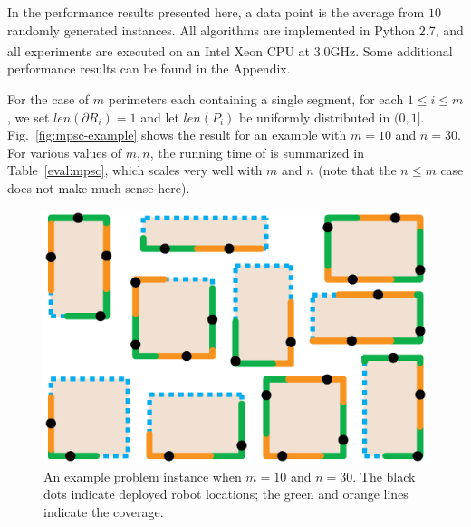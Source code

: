 In the performance results presented here, a data point is the 
average from $10$ randomly generated \opg instances. All algorithms 
are implemented in Python 2.7, and all experiments are executed on 
an Intel\textsuperscript{\textregistered} Xeon\textsuperscript{\textregistered} 
CPU at 3.0GHz. %
Some additional performance results can be found in the Appendix.

For the case of $m$ perimeters each containing a single segment, for 
each $1 \le i \le m$, we set $len(\partial R_i) = 1$ and let $len(P_i)$ 
be uniformly distributed in $(0, 1]$. Fig.~\ref{fig:mpsc-example} shows 
the result for an example with $m = 10$ and $n = 30$. For various values 
of $m, n$, the running time of \algoMRSimple is summarized in 
Table~\ref{eval:mpsc}, which scales very well with $m$ and $n$ (note that 
the $n \le m$ case does not make much sense here). 

\begin{figure}[ht!]
    \vspace*{-3mm}
    \centering
    \includegraphics[keepaspectratio, scale=0.32]{./chapters/opg/figures/mpsc-example.eps}
    \vspace*{-6mm}
    \caption{\label{fig:opg-mpsc-example} 
    An example problem instance when $m = 10$ and $n = 30$. The black dots
		indicate deployed robot locations; the green and orange lines indicate
		the coverage.
		}
    \vspace*{-2mm}
\end{figure}

